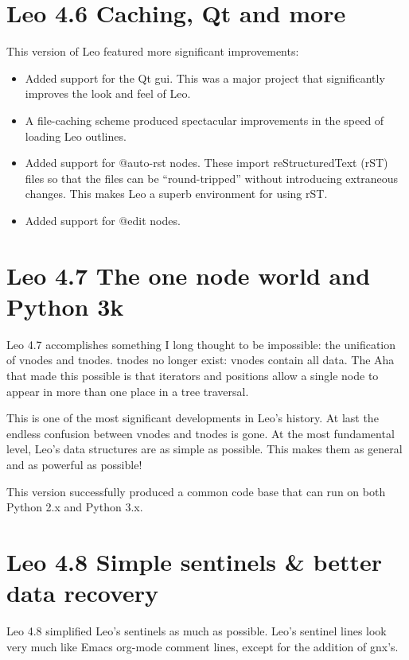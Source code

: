 \documentclass[a4paper,10pt,english]{sphinxmanual}
\begin{document}
\section{Leo 4.6 Caching, Qt and more}
\label{history:leo-4-6-caching-qt-and-more}
This version of Leo featured more significant improvements:
\begin{itemize}
\item {} 
Added support for the Qt gui.  This was a major project that
significantly improves the look and feel of Leo.

\item {} 
A file-caching scheme produced spectacular improvements in the
speed of loading Leo outlines.

\item {} 
Added support for @auto-rst nodes. These import reStructuredText (rST) files
so that the files can be ``round-tripped'' without introducing extraneous
changes. This makes Leo a superb environment for using rST.

\item {} 
Added support for @edit nodes.

\end{itemize}


\section{Leo 4.7 The one node world and Python 3k}
\label{history:leo-4-7-the-one-node-world-and-python-3k}
Leo 4.7 accomplishes something I long thought to be impossible: the unification
of vnodes and tnodes. tnodes no longer exist: vnodes contain all data. The Aha
that made this possible is that iterators and positions allow a single node to
appear in more than one place in a tree traversal.

This is one of the most significant developments in Leo's history. At last the
endless confusion between vnodes and tnodes is gone. At the most fundamental
level, Leo's data structures are as simple as possible. This makes them as
general and as powerful as possible!

This version successfully produced a common code base that can run on both
Python 2.x and Python 3.x.


\section{Leo 4.8 Simple sentinels \& better data recovery}
\label{history:leo-4-8-simple-sentinels-better-data-recovery}
Leo 4.8 simplified Leo's sentinels as much as possible.
Leo's sentinel lines look very much like Emacs org-mode comment lines,
except for the addition of gnx's.
\end{document}

